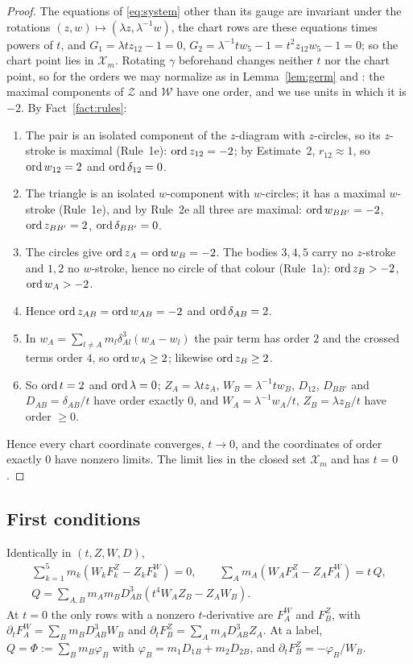 \begin{proof}
The equations of \eqref{eq:system} other than its gauge are invariant under the rotations
$(z,w)\mapsto(\lambda z,\lambda^{-1}w)$, the chart rows are these equations times powers of $t$,
and $G_1=\lambda tz_{12}-1=0$, $G_2=\lambda^{-1}tw_5-1=t^2z_{12}w_5-1=0$; so the chart point lies
in $\mathcal X_m$.  Rotating $\gamma$ beforehand changes neither $t$ nor the chart point, so for the
orders we may normalize as in Lemma~\ref{lem:germ} and \cite[p.~547]{AK}: the maximal components
of $\mathcal Z$ and $\mathcal W$ have one order, and we use units in which it is $-2$.  By
Fact~\ref{fact:rules}:
\begin{enumerate}
  \item The pair is an isolated component of the $z$-diagram with $z$-circles, so its $z$-stroke
  is maximal (Rule~1e): $\operatorname{ord} z_{12}=-2$; by Estimate~2, $r_{12}\approx1$, so $\operatorname{ord} w_{12}=2$ and
  $\operatorname{ord}\delta_{12}=0$.
  \item The triangle is an isolated $w$-component with $w$-circles; it has a maximal $w$-stroke
  (Rule~1e), and by Rule~2e all three are maximal: $\operatorname{ord} w_{BB'}=-2$, $\operatorname{ord} z_{BB'}=2$,
  $\operatorname{ord}\delta_{BB'}=0$.
  \item The circles give $\operatorname{ord} z_A=\operatorname{ord} w_B=-2$.  The bodies $3,4,5$ carry no $z$-stroke and
  $1,2$ no $w$-stroke, hence no circle of that colour (Rule~1a): $\operatorname{ord} z_B>-2$, $\operatorname{ord} w_A>-2$.
  \item Hence $\operatorname{ord} z_{AB}=\operatorname{ord} w_{AB}=-2$ and $\operatorname{ord}\delta_{AB}=2$.
  \item In $w_A=\sum_{l\ne A}m_l\delta_{Al}^3(w_A-w_l)$ the pair term has order $2$ and the
  crossed terms order $4$, so $\operatorname{ord} w_A\ge2$; likewise $\operatorname{ord} z_B\ge2$.
  \item So $\operatorname{ord} t=2$ and $\operatorname{ord}\lambda=0$; $Z_A=\lambda tz_A$, $W_B=\lambda^{-1}tw_B$, $D_{12}$,
  $D_{BB'}$ and $D_{AB}=\delta_{AB}/t$ have order exactly $0$, and $W_A=\lambda^{-1}w_A/t$,
  $Z_B=\lambda z_B/t$ have order $\ge0$.
\end{enumerate}
Hence every chart coordinate converges, $t\to0$, and the coordinates of order exactly $0$ have
nonzero limits.  The limit lies in the closed set $\mathcal X_m$ and has $t=0$.
\end{proof}

\subsection{First conditions}\label{sec:d2-first}

\begin{lemma}[Syzygies]\label{lem:d2-syzygy}
Identically in $(t,Z,W,D)$,
\begin{gather*}
  \textstyle\sum_{k=1}^5m_k(W_kF^Z_k-Z_kF^W_k)=0,\qquad
  \sum_Am_A(W_AF^Z_A-Z_AF^W_A)=t\,Q,\\
  Q=\textstyle\sum_{A,B}m_Am_BD_{AB}^3(t^4W_AZ_B-Z_AW_B).
\end{gather*}
At $t=0$ the only rows with a nonzero $t$-derivative are $F^W_A$ and $F^Z_B$, with
$\partial_tF^W_A=\sum_Bm_BD_{AB}^3W_B$ and $\partial_tF^Z_B=\sum_Am_AD_{AB}^3Z_A$.  At a label,
$Q=\Phi:=\sum_Bm_B\varphi_B$ with $\varphi_B=m_1D_{1B}+m_2D_{2B}$, and
$\partial_tF^Z_B=-\varphi_B/W_B$.
\end{lemma}

